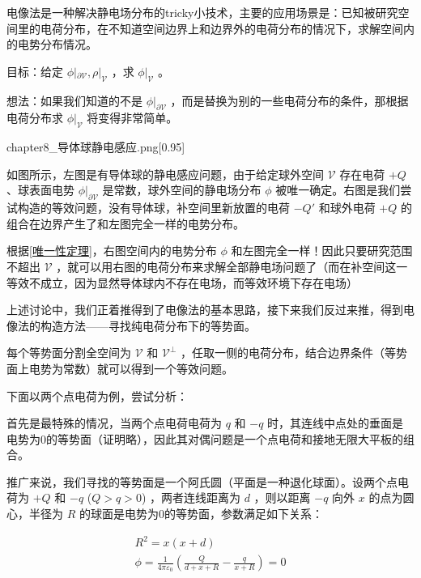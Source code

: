 电像法是一种解决静电场分布的tricky小技术，主要的应用场景是：已知被研究空间里的电荷分布，在不知道空间边界上和边界外的电荷分布的情况下，求解空间内的电势分布情况。

目标：给定 $\phi|_{\partial \mathcal{V}},\rho|_{\mathcal{V}}$ ，求 $\phi|_{\mathcal{V}}$ 。

想法：如果我们知道的不是 $\phi|_{\partial \mathcal{V}}$ ，而是替换为别的一些电荷分布的条件，那根据电荷分布求 $\phi|_{\mathcal{V}}$ 将变得非常简单。

\begin{singlefigure}[导体球静电感应]{chapter8_导体球静电感应.png}[0.95]
\end{singlefigure}

如图所示，左图是有导体球的静电感应问题，由于给定球外空间 $\mathcal{V}$ 存在电荷 $+Q$ 、球表面电势 $\phi|_{\partial \mathcal{V}}$ 是常数，球外空间的静电场分布 $\phi$ 被唯一确定。右图是我们尝试构造的等效问题，没有导体球，补空间里新放置的电荷 $-Q'$ 和球外电荷 $+Q$ 的组合在边界产生了和左图完全一样的电势分布。

根据\hyperref[prove:uniqueness]{[唯一性定理]}，右图空间内的电势分布 $\phi$ 和左图完全一样！因此只要研究范围不超出 $\mathcal{V}$ ，就可以用右图的电荷分布来求解全部静电场问题了（而在补空间这一等效不成立，因为显然导体球内不存在电场，而等效环境下存在电场）

上述讨论中，我们正着推得到了电像法的基本思路，接下来我们反过来推，得到电像法的构造方法——寻找纯电荷分布下的等势面。

每个等势面分割全空间为 $\mathcal{V}$ 和 $\mathcal{V^{\perp}}$ ，任取一侧的电荷分布，结合边界条件（等势面上电势为常数）就可以得到一个等效问题。

下面以两个点电荷为例，尝试分析：

首先是最特殊的情况，当两个点电荷电荷为 $q$ 和 $-q$ 时，其连线中点处的垂面是电势为0的等势面（证明略），因此其对偶问题是一个点电荷和接地无限大平板的组合。

推广来说，我们寻找的等势面是一个阿氏圆（平面是一种退化球面）。设两个点电荷为 $+Q$ 和 $-q$ ($Q>q>0$) ，两者连线距离为 $d$ ，则以距离 $-q$ 向外 $x$ 的点为圆心，半径为 $R$ 的球面是电势为0的等势面，参数满足如下关系：
\begin{center}
    \begin{align}
        R^2 = x (x+d) \\
        \phi = \frac{1}{4\pi \varepsilon_0} \left( \frac{Q}{d+x+R} - \frac{q}{x+R} \right) = 0
    \end{align}
\end{center}

